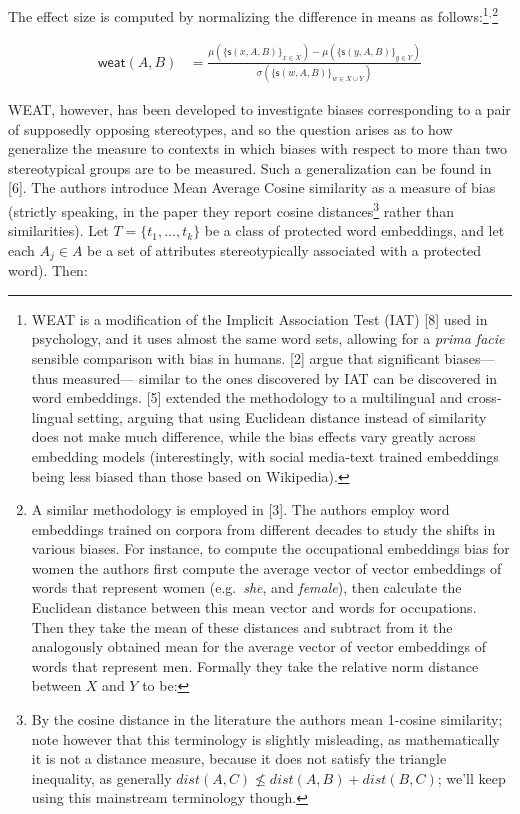 \documentclass[
  10pt,
  dvipsnames,enabledeprecatedfontcommands, twocolumn]{scrartcl}
\begin{document}
The effect size is computed by normalizing the difference in means as
follows:\footnote{ WEAT is a modification of the Implicit Association
  Test (IAT) {[}8{]} used in psychology, and it uses almost the same
  word sets, allowing for a \emph{prima facie} sensible comparison with
  bias in humans. {[}2{]} argue that significant biases---thus
  measured--- similar to the ones discovered by IAT can be discovered in
  word embeddings. {[}5{]} extended the methodology to a multilingual
  and cross-lingual setting, arguing that using Euclidean distance
  instead of similarity does not make much difference, while the bias
  effects vary greatly across embedding models (interestingly, with
  social media-text trained embeddings being less biased than those
  based on Wikipedia).}\(^{, }\)\footnote{ A similar methodology is
  employed in {[}3{]}. The authors employ word embeddings trained on
  corpora from different decades to study the shifts in various biases.
  For instance, to compute the occupational embeddings bias for women
  the authors first compute the average vector of vector embeddings of
  words that represent women (e.g.~\emph{she}, and \emph{female}), then
  calculate the Euclidean distance between this mean vector and words
  for occupations. Then they take the mean of these distances and
  subtract from it the analogously obtained mean for the average vector
  of vector embeddings of words that represent men. Formally they take
  the relative norm distance between \(X\) and \(Y\) to be:}

\vspace{-2mm}

\footnotesize

\begin{align}
\mathsf{weat}(A,B) & = \frac{
\mu(\{\mathsf{s}(x,A,B)\}_{x\in X}) -\mu(\{\mathsf{s}(y,A,B)\}_{y\in Y}) 
}{
\sigma(\{\mathsf{s}(w,A,B)\}_{w\in X\cup Y})
}
\end{align}

\normalsize

WEAT, however, has been developed to investigate biases corresponding to
a pair of supposedly opposing stereotypes, and so the question arises as
to how generalize the measure to contexts in which biases with respect
to more than two stereotypical groups are to be measured. Such a
generalization can be found in {[}6{]}. The authors introduce Mean
Average Cosine similarity as a measure of bias (strictly speaking, in
the paper they report cosine distances\footnote{By the cosine distance
  in the literature the authors mean 1-cosine similarity; note however
  that this terminology is slightly misleading, as mathematically it is
  not a distance measure, because it does not satisfy the triangle
  inequality, as generally \(dist(A,C) \not \leq dist(A,B)+ dist(B,C)\);
  we'll keep using this mainstream terminology though.} rather than
similarities). Let \(T = \{t_1, \dots, t_k\}\) be a class of protected
word embeddings, and let each \(A_j\in A\) be a set of attributes
stereotypically associated with a protected word). Then:
\end{document}
